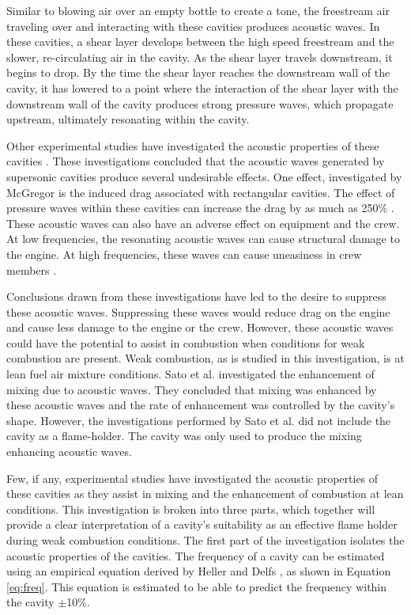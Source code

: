 Similar to blowing air over an empty bottle to create a tone, the freestream air traveling over and interacting with these cavities produces acoustic waves. In these cavities, a shear layer develops between the high speed freestream and the slower, re-circulating air in the cavity. As the shear layer travels downstream, it begins to drop. By the time the shear layer reaches the downstream wall of the cavity, it has lowered to a point where the interaction of the shear layer with the downstream wall of the cavity produces strong pressure waves, which propagate upstream, ultimately resonating within the cavity. 

Other experimental studies have investigated the acoustic properties of these cavities \cite{unalmis2004cavity,heller1996letter,williams2007supersonic, mcgregor1970drag,luo2011drag, sato1999advanced}. These investigations concluded that the acoustic waves generated by supersonic cavities produce several undesirable effects. One effect, investigated by McGregor is the induced drag associated with rectangular cavities. The effect of pressure waves within these cavities can increase the drag by as much as 250\% \cite{mcgregor1970drag}. These acoustic waves can also have an adverse effect on equipment and the crew. At low frequencies, the resonating acoustic waves can cause structural damage to the engine. At high frequencies, these waves can cause uneasiness in crew members \cite{mcgregor1970drag}.

Conclusions drawn from these investigations have led to the desire to suppress these acoustic waves. Suppressing these waves would reduce drag on the engine and cause less damage to the engine or the crew. However, these acoustic waves could have the potential to assist in combustion when conditions for weak combustion are present. Weak combustion, as is studied in this investigation, is at lean fuel air mixture conditions. Sato et al.\cite{sato1999advanced} investigated the enhancement of mixing due to acoustic waves. They concluded that mixing was enhanced by these acoustic waves and the rate of enhancement was controlled by the cavity's shape. However, the investigations performed by Sato et al. did not include the cavity as a flame-holder. The cavity was only used to produce the mixing enhancing acoustic waves. 

Few, if any, experimental studies have investigated the acoustic properties of these cavities as they assist in mixing and the enhancement of combustion at lean conditions. This investigation is broken into three parts, which together will provide a clear interpretation of a cavity's suitability as an effective flame holder during weak combustion conditions. The first part of the investigation isolates the acoustic properties of the cavities. The frequency of a cavity can be estimated using an empirical equation derived by Heller and Delfs \cite{heller1996letter}, as shown in Equation \ref{eq:freq}. This equation is estimated to be able to predict the frequency within the cavity $\pm$10\%\cite{heller1996letter}.

